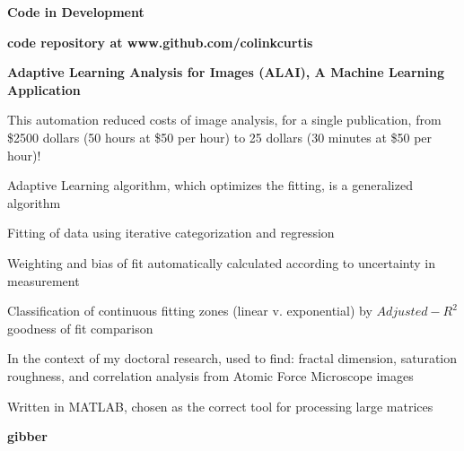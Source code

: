 \documentclass[letterpaper,final]{memoir}
\newcommand{\LargeSep}{\vspace{1.3em}}
\newcommand{\Sep}{\vspace{1.0em}}
\newcommand{\SmallSep}{\vspace{0.4em}}
\newcommand{\CVSection}[1]
	{\LARGE\textbf{#1}\par
	\SmallSep\normalsize}
\newcommand{\CVItem}[1]
	{\textbf{\color{Blue} #1}}
\begin{document}
\LargeSep


\notoserif \CVSection{Code in Development}

\normalfont

\Sep

\CVItem{code repository at www.github.com/colinkcurtis} 

\Sep

\CVItem{Adaptive Learning Analysis for Images (ALAI), A Machine Learning Application} 

\begin{compactitem}[\color{Blue}$\circ$]
   
    \SmallSep

    \item This automation reduced costs of image analysis, for a single publication, from \$2500 dollars (50 hours at \$50 per hour) to 25 dollars (30 minutes at \$50 per hour)!

    \item Adaptive Learning algorithm, which optimizes the fitting, is a generalized algorithm

    \item Fitting of data using iterative categorization and regression

    \item Weighting and bias of fit automatically calculated according to uncertainty in measurement

    \item Classification of continuous fitting zones (linear v. exponential) by $Adjusted-R^2$ goodness of fit comparison

    \item In the context of my doctoral research, used to find: fractal dimension, saturation roughness, and correlation analysis from Atomic Force Microscope images

    \item Written in MATLAB, chosen as the correct tool for processing large matrices
    

\end{compactitem}

\newpage

\CVItem{gibber} 
\end{document}
